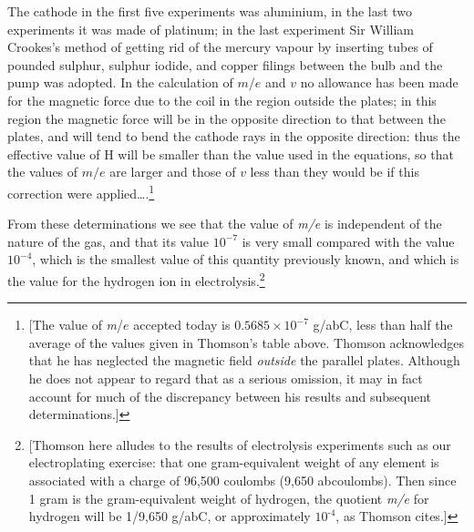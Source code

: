 The cathode in the first five experiments was aluminium, in the last two
experiments it was made of platinum; in the last experiment Sir William
Crookes's method of getting rid of the mercury vapour by inserting tubes
of pounded sulphur, sulphur iodide, and copper filings between the bulb
and the pump was adopted. In the calculation of $m/e$ and $v$
no allowance has been made for the magnetic force due to the coil in the
region outside the plates; in this region the magnetic force will be in
the opposite direction to that between the plates, and will tend to bend
the cathode rays in the opposite direction: thus the effective value of
H will be smaller than the value used in the equations, so that the
values of $m/e$ are larger and those of $v$ less than they
would be if this correction were applied\ldots.\footnote{{[}The value of
  \emph{m}/$e$ accepted today is $0.5685\!\times\!10^{-7}$ g/abC, less than
  half the average of the values given in Thomson's table above. Thomson
  acknowledges that he has neglected the magnetic field \emph{outside}
  the parallel plates. Although he does not appear to regard that as a
  serious omission, it may in fact account for much of the discrepancy
  between his results and subsequent determinations.{]}}

From these determinations we see that the value of \emph{m/e} is
independent of the nature of the gas, and that its value $10^{-7}$ is very
small compared with the value $10^{-4}$, which is the smallest value of this
quantity previously known, and which is the value for the hydrogen ion
in electrolysis.\footnote{{[}Thomson here alludes to the results of
  electrolysis experiments such as our electroplating exercise: that one
  gram-equivalent weight of any element is associated with a charge of
  96,500 coulombs (9,650 abcoulombs). Then since 1 gram is the
  gram-equivalent weight of hydrogen, the quotient \emph{m/e} for
  hydrogen will be 1/9,650 g/abC, or approximately $10^{‑4}$, as Thomson
  cites.{]}}

